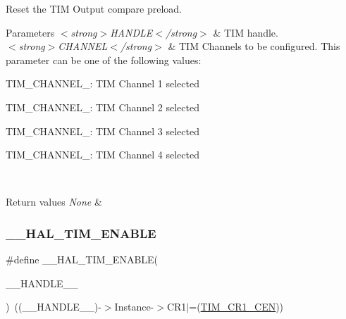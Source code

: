 Reset the T\+IM Output compare preload. 


\begin{DoxyParams}{Parameters}
{\em $<$strong$>$\+H\+A\+N\+D\+L\+E$<$/strong$>$} & T\+IM handle. \\
\hline
{\em $<$strong$>$\+C\+H\+A\+N\+N\+E\+L$<$/strong$>$} & T\+IM Channels to be configured. This parameter can be one of the following values\+: \begin{DoxyItemize}
\item T\+I\+M\+\_\+\+C\+H\+A\+N\+N\+E\+L\+\_\+: T\+IM Channel 1 selected \item T\+I\+M\+\_\+\+C\+H\+A\+N\+N\+E\+L\+\_\+: T\+IM Channel 2 selected \item T\+I\+M\+\_\+\+C\+H\+A\+N\+N\+E\+L\+\_\+: T\+IM Channel 3 selected \item T\+I\+M\+\_\+\+C\+H\+A\+N\+N\+E\+L\+\_\+: T\+IM Channel 4 selected \end{DoxyItemize}
\\
\hline
\end{DoxyParams}

\begin{DoxyRetVals}{Return values}
{\em None} & \\
\hline
\end{DoxyRetVals}
\mbox{\label{group___t_i_m___exported___macros_ga1a90544705059e9f19f991651623b0c0}} 
\subsubsection{\texorpdfstring{\+\_\+\+\_\+\+H\+A\+L\+\_\+\+T\+I\+M\+\_\+\+E\+N\+A\+B\+LE}{\_\_HAL\_TIM\_ENABLE}}
{\footnotesize\ttfamily \#define \+\_\+\+\_\+\+H\+A\+L\+\_\+\+T\+I\+M\+\_\+\+E\+N\+A\+B\+LE(\begin{DoxyParamCaption}\item[{}]{\+\_\+\+\_\+\+H\+A\+N\+D\+L\+E\+\_\+\+\_\+ }\end{DoxyParamCaption})~((\+\_\+\+\_\+\+H\+A\+N\+D\+L\+E\+\_\+\+\_\+)-\/$>$Instance-\/$>$C\+R1$\vert$=(\hyperlink{group___peripheral___registers___bits___definition_ga93d86355e5e3b399ed45e1ca83abed2a}{T\+I\+M\+\_\+\+C\+R1\+\_\+\+C\+EN}))}



